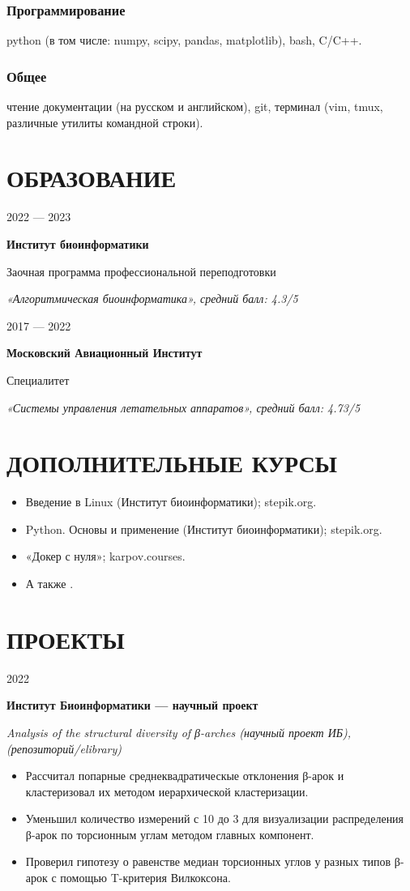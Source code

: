 \documentclass[9pt]{article}
\newcommand{\learn}[5]{
    \begin{minipage}[t]{.2\textwidth}
        #1
    \end{minipage}
    \begin{minipage}[t]{.7\textwidth}
        {\bfseries #2}

        {#3}

        \textit{#4, средний балл: #5}
    \end{minipage}

    \vspace{.5em}
}
\newcommand{\project}[4]{
    \begin{minipage}[t]{.1\textwidth}
        #1
    \end{minipage}
    \begin{minipage}[t]{.87\textwidth}
        {\bfseries #2}

        \textit{#3}

        \vspace{-1em}

        {#4}
    \end{minipage}
}
\newcommand{\myhref}[3][cyan]{\href{#2}{\color{#1}{#3}}}%
\begin{document}
\subsubsection{Программирование}
python (в том числе: numpy, scipy, pandas, matplotlib), bash, C/C++.

\subsubsection{Общее}
чтение документации (на русском и английском), git, терминал (vim, tmux, различные утилиты командной строки).

\vspace{.5em}

\section{ОБРАЗОВАНИЕ}

\learn
{2022 --- 2023}
{Институт биоинформатики}
{Заочная программа профессиональной переподготовки}
{«Алгоритмическая биоинформатика»}
{4.3/5}

\learn
{2017 — 2022}
{Московский Авиационный Институт}
{Специалитет}
{«Системы управления летательных аппаратов»}
{4.73/5}

\section{ДОПОЛНИТЕЛЬНЫЕ КУРСЫ}

\begin{itemize}
    \setlength\itemsep{-.5em}
    \item Введение в Linux (Институт биоинформатики); stepik.org.
    \item Python. Основы и применение (Институт биоинформатики); stepik.org.
    \item «Докер с нуля»; karpov.courses.
    \item А также \myhref{https://drive.google.com/drive/folders/1EPNQ5b6PDVWkMzCplopYXnyJJu4l9fev?usp=drive_link}{другие}.
\end{itemize}

\section{ПРОЕКТЫ}

\project
{2022}
{Институт Биоинформатики — научный проект}
{Analysis of the structural diversity of β-arches (научный проект ИБ), (репозиторий/elibrary)}
{
    \begin{itemize}
        \setlength\itemsep{-.5em}
        \item Рассчитал попарные среднеквадратическые отклонения β-арок и кластеризовал их методом иерархической кластеризации.
        \item Уменьшил количество измерений с 10 до 3 для визуализации распределения β-арок по торсионным углам методом главных компонент.
        \item Проверил гипотезу о равенстве медиан торсионных углов у разных типов β-арок с помощью T-критерия Вилкоксона.
    \end{itemize}
}
\end{document}
